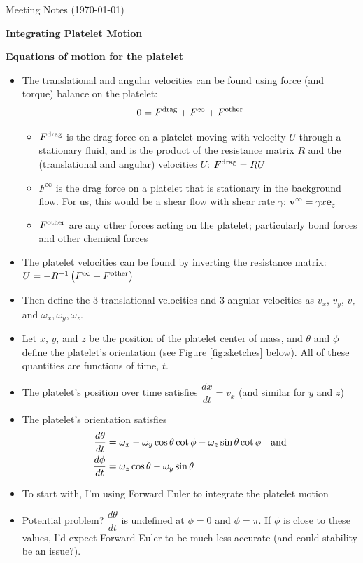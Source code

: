 \documentclass{article}
\newcommand{\tn}{\textnormal}
\begin{document}
\pagestyle{plain}

\begin{center}
  {\Large Meeting Notes (\today)}
\end{center}

{\Large \textbf{Integrating Platelet Motion}}

\textbf{Equations of motion for the platelet}
\begin{itemize}
\item The translational and angular velocities can be found using
  force (and torque) balance on the platelet:
  \[
    0 = F^\tn{drag} + F^\infty + F^\tn{other}
  \]
  \begin{itemize}
  \item $F^\tn{drag}$ is the drag force on a platelet moving with
    velocity $U$ through a stationary fluid, and is the product of the
    resistance matrix $R$ and the (translational and angular) velocities
    $U$: $F^\tn{drag} = RU$
  \item $F^\infty$ is the drag force on a platelet that is stationary in
    the background flow. For us, this would be a shear flow with shear
    rate $\gamma$: $\mathbf{v}^\infty = \gamma x \mathbf{e}_z$
  \item $F^\tn{other}$ are any other forces acting on the platelet;
    particularly bond forces and other chemical forces
  \end{itemize}
\item The platelet velocities can be found by inverting the resistance
  matrix: $U = -R^{-1}\left(F^\infty + F^\tn{other}\right)$
\item Then define the 3 translational velocities and 3 angular
  velocities as $v_x$, $v_y$, $v_z$ and $\omega_x, \omega_y, \omega_z$.
\item Let $x$, $y$, and $z$ be the position of the platelet center of
  mass, and $\theta$ and $\phi$ define the platelet's orientation (see
  Figure \ref{fig:sketches} below). All of these quantities are
  functions of time, $t$.
\item The platelet's position over time satisfies
  $\dfrac{dx}{dt} = v_x$ (and similar for $y$ and $z$)
\item The platelet's orientation satisfies
  \begin{align*}
    \frac{d\theta}{dt} &= \omega_x - \omega_y \cos\theta \cot\phi -
                         \omega_z \sin\theta \cot\phi \quad \tn{and} \\
    \frac{d\phi}{dt} &= \omega_z \cos\theta - \omega_y \sin\theta
  \end{align*}
\item To start with, I'm using Forward Euler to integrate the platelet
  motion
\item Potential problem? $\dfrac{d\theta}{dt}$ is undefined at
  $\phi = 0$ and $\phi = \pi$. If $\phi$ is close to these values, I'd
  expect Forward Euler to be much less accurate (and could stability
  be an issue?).
\end{itemize}
\end{document}
